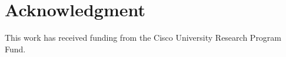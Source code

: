 \documentclass[10pt,journal,twocolumn]{IEEEtran}
\newif\ifextended
\newif\ifshortver
\newcommand{\extended}[1]{\ifextended \ifshortver \textcolor{purple}{#1} \else \textcolor{black}{#1} \fi  \fi}
\begin{document}
\maketitle
\IEEEdisplaynontitleabstractindextext
\IEEEpeerreviewmaketitle







\begin{comment}


\end{comment}

\extended{}

\section*{Acknowledgment}
    This work has received funding from the Cisco University Research Program Fund.



\end{document}
